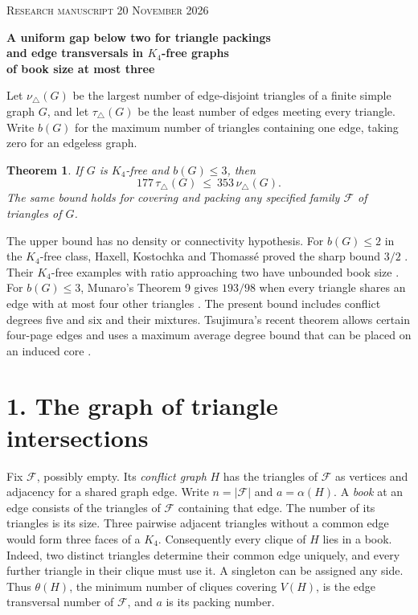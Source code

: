 \documentclass[11pt,a4paper]{article}
\newtheorem{theorem}{Theorem}
\newcommand{\F}{\mathcal F}
\begin{document}
{\small\scshape Research manuscript \hfill 20 November 2026}
\medskip

{\LARGE\bfseries A uniform gap below two for triangle packings\\[-1pt]
and edge transversals in \(K_4\)-free graphs\\[-1pt]
of book size at most three\par}
\medskip

Let \(\nu_\triangle(G)\) be the largest number of edge-disjoint triangles of
a finite simple graph \(G\), and let \(\tau_\triangle(G)\) be the least
number of edges meeting every triangle. Write \(b(G)\) for the maximum
number of triangles containing one edge, taking zero for an edgeless graph.

\begin{theorem}\label{thm:main}
If \(G\) is \(K_4\)-free and \(b(G)\le3\), then
\[
              177\,\tau_\triangle(G)\ \le\ 353\,\nu_\triangle(G).
\]
The same bound holds for covering and packing any specified family
\(\F\) of triangles of \(G\).
\end{theorem}

The upper bound has no density or connectivity hypothesis. For \(b(G)\le2\)
in the \(K_4\)-free class, Haxell, Kostochka and Thomassé
proved the sharp bound \(3/2\) \cite{hktflat}. Their \(K_4\)-free examples
with ratio approaching two have unbounded book size \cite{hktfrac}.
For \(b(G)\le3\), Munaro's Theorem 9 gives \(193/98\) when every triangle
shares an edge with at most four other triangles \cite{munaro}.
The present bound includes conflict degrees five and six and their mixtures.
Tsujimura's recent theorem allows certain four-page edges and uses a maximum
average degree bound that can be placed on an induced core \cite{tsu}.

\section*{1. The graph of triangle intersections}

Fix \(\F\), possibly empty. Its \emph{conflict graph} \(H\) has the triangles
of \(\F\) as vertices and adjacency for a shared graph edge. Write \(n=|\F|\)
and \(a=\alpha(H)\). A \emph{book} at an edge consists of the triangles of
\(\F\) containing that edge. The number of its triangles is its size. Three
pairwise adjacent triangles without a common edge would form three faces of
a \(K_4\). Consequently every clique of \(H\) lies in a book. Indeed, two
distinct triangles determine their common edge uniquely, and every further
triangle in their clique must use it. A singleton can be assigned any side.
Thus \(\theta(H)\), the minimum number of cliques covering \(V(H)\), is the
edge transversal number of \(\F\), and \(a\) is its packing number.
\end{document}
